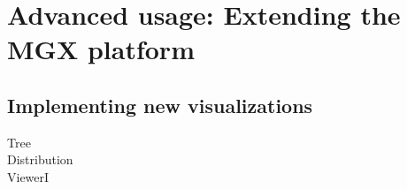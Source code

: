 
\chapter{Advanced usage: Extending the MGX platform}
\label{extending}

\section{Implementing new visualizations}

Tree\\
Distribution\\
ViewerI\\

